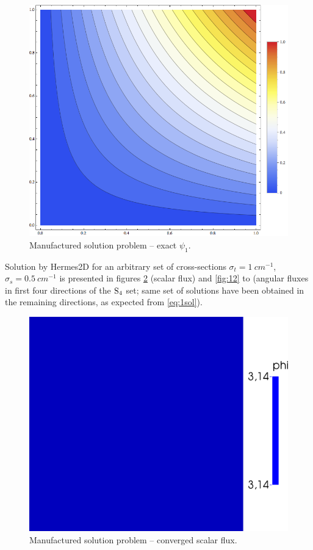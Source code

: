 \begin{figure}[!ht]
\centering
  \includegraphics[scale=.275]{exact/exact}
  \caption[Manufactured solution problem]{Manufactured solution problem -- exact $\psi_1$.}
  \label{fig:10}
\end{figure}

Solution by Hermes2D for
an arbitrary set of cross-sections $\sigma_t = \SI{1}{cm^{-1}}$, $\sigma_s = \SI{0.5}{cm^{-1}}$ is presented in figures
\ref{fig:11} (scalar flux) and \ref{fig:12} to (angular fluxes in first four directions of the $\SN[4]$ set; same set of solutions 
have been obtained in the remaining directions, as expected from \eqref{eq:1sol}). 
\begin{figure}[!ht]
\centering
  \includegraphics[scale=.2]{exact/phi-conv}
  \caption[Manufactured solution problem -- converged scalar flux]{Manufactured solution problem -- converged scalar
  flux.}
  \label{fig:11}
\end{figure}


